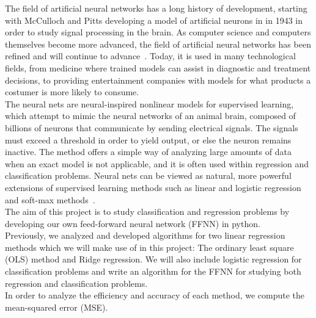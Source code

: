 \documentclass[english,notitlepage,reprint,nofootinbib]{revtex4–2}  %
\begin{document}
The field of artificial neural networks has a long history of development, starting with McCulloch and Pitts developing a model of artificial neurons in in 1943 in order to study signal processing in the brain. As computer science and computers themselves become more advanced, the field of artificial neural networks has been refined and will continue to advance~\cite{lecture_notes}. Today, it is used in many technological fields, from medicine where trained models can assist in diagnostic and treatment decisions, to providing entertainment companies with models for what products a costumer is more likely to consume. 
\vspace{3mm}
\\
The neural nets are neural-inspired nonlinear models for supervised learning, which attempt to mimic the neural networks of an animal brain, composed of billions of neurons that communicate by sending electrical signals. The signals must exceed a threshold in order to yield output, or else the neuron remains inactive. 
The method offers a simple way of analyzing large amounts of data when an exact model is not applicable, and it is often used within regression and classification problems. Neural nets can be viewed as natural, more powerful extensions of supervised learning methods such as linear and logistic regression and soft-max methods~\cite{lecture_notes}. 
\vspace{3mm}
\\
The aim of this project is to study classification and regression problems by developing our own feed-forward neural network (FFNN) in python. 
\vspace{3mm}
\\
Previously, we analyzed and developed algorithms for two linear regression methods which we will make use of in this project: The ordinary least square (OLS) method and Ridge regression. We will also include logistic regression for classification problems and write an algorithm for the FFNN for studying both regression and classification problems. %
\vspace{3mm}
\\
In order to analyze the efficiency and accuracy of each method, we compute the mean-squared error (MSE). %
\end{document}
